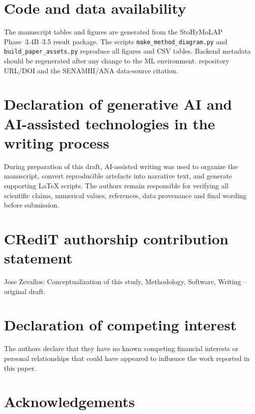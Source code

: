 \documentclass[a4paper,fleqn]{cas-sc}
\begin{document}
\section*{Code and data availability}

The manuscript tables and figures are generated from the StoHyMoLAP
Phase~3.4B--3.5 result package. The scripts
\texttt{make\_method\_diagram.py} and \texttt{build\_paper\_assets.py}
reproduce all figures and CSV tables. Backend metadata should be
regenerated after any change to the ML environment. %
repository URL/DOI and the SENAMHI/ANA data-source citation.

\section*{Declaration of generative AI and AI-assisted technologies
in the writing process}

During preparation of this draft, AI-assisted writing was used to
organize the manuscript, convert reproducible artefacts into narrative
text, and generate supporting LaTeX scripts. The authors remain
responsible for verifying all scientific claims, numerical values,
references, data provenance and final wording before submission.

\section*{CRediT authorship contribution statement}

Jose Zevallos: Conceptualization of this study, Methodology, Software,
Writing -- original draft.

\section*{Declaration of competing interest}

The authors declare that they have no known competing financial
interests or personal relationships that could have appeared to
influence the work reported in this paper.

\section*{Acknowledgements}

\printcredits




\end{document}
